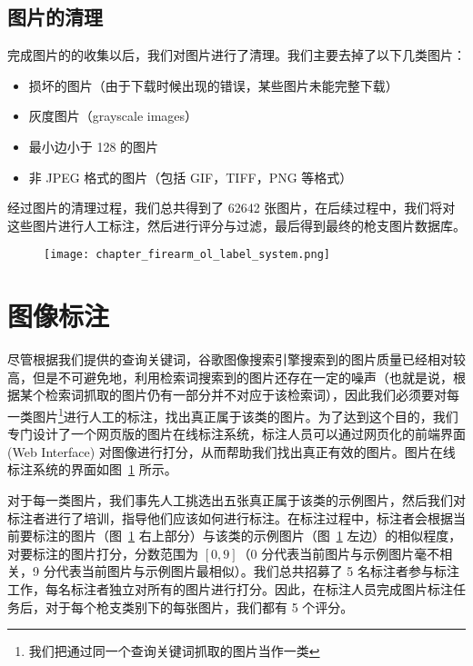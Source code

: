 \subsection{图片的清理}
完成图片的的收集以后，我们对图片进行了清理。我们主要去掉了以下几类图片：
\begin{itemize}
\item 损坏的图片（由于下载时候出现的错误，某些图片未能完整下载）
\item 灰度图片（grayscale images）
\item 最小边小于 128 的图片
\item 非 JPEG 格式的图片（包括 GIF，TIFF，PNG 等格式）
\end{itemize}

经过图片的清理过程，我们总共得到了 62642 张图片，在后续过程中，我们将对这些图片进行人工标注，然后进行评分与过滤，最后得到最终的枪支图片数据库。

\begin{figure}[!t]
	\centering
	\texttt{[image: chapter\_firearm\_ol\_label\_system.png]}
	\label{fig:online_label_system}
\end{figure}

\section{图像标注}\label{sec:image_labeling}

尽管根据我们提供的查询关键词，谷歌图像搜索引擎搜索到的图片质量已经相对较高，但是不可避免地，利用检索词搜索到的图片还存在一定的噪声（也就是说，根据某个检索词抓取的图片仍有一部分并不对应于该检索词），因此我们必须要对每一类图片\footnote{我们把通过同一个查询关键词抓取的图片当作一类}进行人工的标注，找出真正属于该类的图片。为了达到这个目的，我们专门设计了一个网页版的图片在线标注系统，标注人员可以通过网页化的前端界面 (Web Interface) 对图像进行打分，从而帮助我们找出真正有效的图片。图片在线标注系统的界面如图~\ref{fig:online_label_system} 所示。

对于每一类图片，我们事先人工挑选出五张真正属于该类的示例图片，然后我们对标注者进行了培训，指导他们应该如何进行标注。在标注过程中，标注者会根据当前要标注的图片（图~\ref{fig:online_label_system} 右上部分）与该类的示例图片（图~\ref{fig:online_label_system} 左边）的相似程度，对要标注的图片打分，分数范围为 $[0,9]$（0 分代表当前图片与示例图片毫不相关，9 分代表当前图片与示例图片最相似）。我们总共招募了 5 名标注者参与标注工作，每名标注者独立对所有的图片进行打分。因此，在标注人员完成图片标注任务后，对于每个枪支类别下的每张图片，我们都有 5 个评分。

